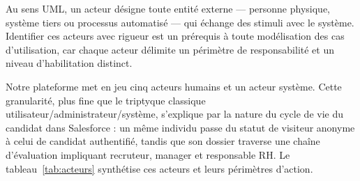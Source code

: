 Au sens UML, un acteur désigne toute entité externe --- personne physique, système tiers ou processus automatisé --- qui échange des stimuli avec le système. Identifier ces acteurs avec rigueur est un prérequis à toute modélisation des cas d'utilisation, car chaque acteur délimite un périmètre de responsabilité et un niveau d'habilitation distinct.

\medskip

Notre plateforme met en jeu cinq acteurs humains et un acteur système. Cette granularité, plus fine que le triptyque classique utilisateur/administrateur/système, s'explique par la nature du cycle de vie du candidat dans Salesforce : un même individu passe du statut de visiteur anonyme à celui de candidat authentifié, tandis que son dossier traverse une chaîne d'évaluation impliquant recruteur, manager et responsable RH. Le tableau~\ref{tab:acteurs} synthétise ces acteurs et leurs périmètres d'action.

